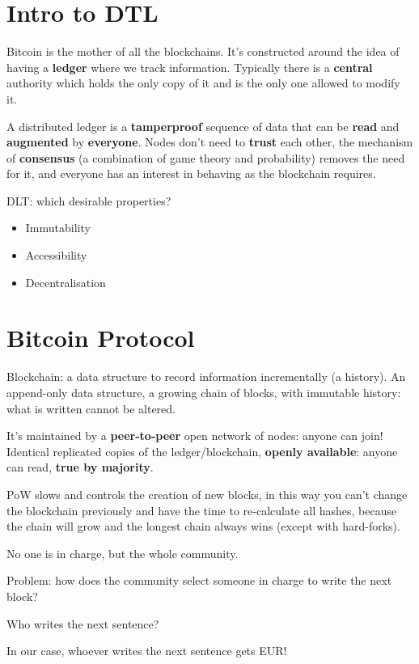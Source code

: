 \section{Intro to DTL}

Bitcoin is the mother of all the blockchains. It's constructed around the idea of having a \textbf{ledger} where we track information. Typically there is a \textbf{central} authority which holds the only copy of it and is the only one allowed to modify it.

A distributed ledger is a \textbf{tamperproof} sequence of data that can be \textbf{read} and \textbf{augmented} by \textbf{everyone}. Nodes don't need to \textbf{trust} each other, the mechanism of \textbf{consensus} (a combination of game theory and probability) removes the need for it, and everyone has an interest in behaving as the blockchain requires.

DLT: which desirable properties?
\begin{itemize}
	\item Immutability
	\item Accessibility
	\item Decentralisation
\end{itemize}

\section{Bitcoin Protocol}

Blockchain: a data structure to record information incrementally (a history). An append-only data structure, a growing chain of blocks, with immutable history: what is written cannot be altered.

It's maintained by a \textbf{peer-to-peer} open network of nodes: anyone can join! Identical replicated copies of the ledger/blockchain, \textbf{openly available}: anyone can read, \textbf{true by majority}.

PoW slows and controls the creation of new blocks, in this way you can't change the blockchain previously and have the time to re-calculate all hashes, because the chain will grow and the longest chain always wins (except with hard-forks).

No one is in charge, but the whole community.

Problem: how does the community select someone in charge to write the next block?

Who writes the next sentence?

In our case, whoever writes the next sentence gets  EUR!

